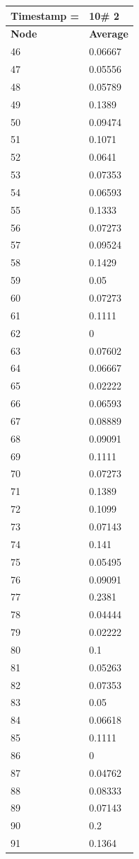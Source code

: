 \begin{tabular}{|l||l|}
\hline
\textbf{Timestamp =} & \textbf{10}\# 2\\\hline
	\textbf{Node} & \textbf{Average} \\ \hline
\hline
	46 & 0.06667 \\ \hline
	47 & 0.05556 \\ \hline
	48 & 0.05789 \\ \hline
	49 & 0.1389 \\ \hline
	50 & 0.09474 \\ \hline
	51 & 0.1071 \\ \hline
	52 & 0.0641 \\ \hline
	53 & 0.07353 \\ \hline
	54 & 0.06593 \\ \hline
	55 & 0.1333 \\ \hline
	56 & 0.07273 \\ \hline
	57 & 0.09524 \\ \hline
	58 & 0.1429 \\ \hline
	59 & 0.05 \\ \hline
	60 & 0.07273 \\ \hline
	61 & 0.1111 \\ \hline
	62 & 0 \\ \hline
	63 & 0.07602 \\ \hline
	64 & 0.06667 \\ \hline
	65 & 0.02222 \\ \hline
	66 & 0.06593 \\ \hline
	67 & 0.08889 \\ \hline
	68 & 0.09091 \\ \hline
	69 & 0.1111 \\ \hline
	70 & 0.07273 \\ \hline
	71 & 0.1389 \\ \hline
	72 & 0.1099 \\ \hline
	73 & 0.07143 \\ \hline
	74 & 0.141 \\ \hline
	75 & 0.05495 \\ \hline
	76 & 0.09091 \\ \hline
	77 & 0.2381 \\ \hline
	78 & 0.04444 \\ \hline
	79 & 0.02222 \\ \hline
	80 & 0.1 \\ \hline
	81 & 0.05263 \\ \hline
	82 & 0.07353 \\ \hline
	83 & 0.05 \\ \hline
	84 & 0.06618 \\ \hline
	85 & 0.1111 \\ \hline
	86 & 0 \\ \hline
	87 & 0.04762 \\ \hline
	88 & 0.08333 \\ \hline
	89 & 0.07143 \\ \hline
	90 & 0.2 \\ \hline
	91 & 0.1364 \\ \hline
\end{tabular}
